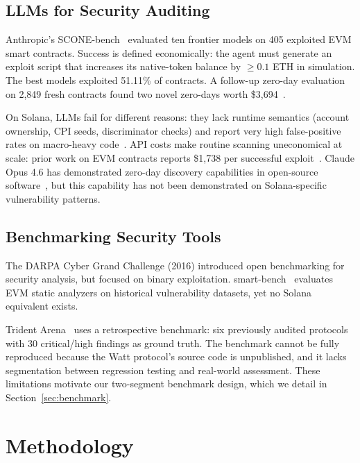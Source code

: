 \documentclass{article}
\begin{document}
\subsection{LLMs for Security Auditing}

Anthropic's SCONE-bench~\citep{anthropic2025sconebench} evaluated ten frontier models on 405 exploited EVM smart contracts. Success is defined economically: the agent must generate an exploit script that increases its native-token balance by $\geq0.1$ ETH in simulation. The best models exploited 51.11\% of contracts. A follow-up zero-day evaluation on 2,849 fresh contracts found two novel zero-days worth \$3,694~\citep{anthropic2025sconebench}.

On Solana, LLMs fail for different reasons: they lack runtime semantics (account ownership, CPI seeds, discriminator checks) and report very high false-positive rates on macro-heavy code~\citep{ackee2026trident_arena}. API costs make routine scanning uneconomical at scale: prior work on EVM contracts reports \$1,738 per successful exploit~\citep{anthropic2025sconebench}. Claude Opus 4.6 has demonstrated zero-day discovery capabilities in open-source software~\citep{anthropic2026zerodays}, but this capability has not been demonstrated on Solana-specific vulnerability patterns.

\subsection{Benchmarking Security Tools}

The DARPA Cyber Grand Challenge (2016) introduced open benchmarking for security analysis, but focused on binary exploitation. smart-bench~\citep{scsa2024smartbench} evaluates EVM static analyzers on historical vulnerability datasets, yet no Solana equivalent exists.

Trident Arena~\citep{ackee2026trident_arena} uses a retrospective benchmark: six previously audited protocols with 30 critical/high findings as ground truth. The benchmark cannot be fully reproduced because the Watt protocol's source code is unpublished, and it lacks segmentation between regression testing and real-world assessment. These limitations motivate our two-segment benchmark design, which we detail in Section~\ref{sec:benchmark}.


\section{Methodology}
\label{sec:method}
\end{document}
